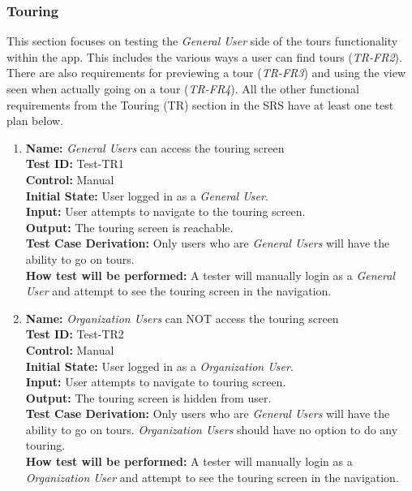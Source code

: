 \documentclass[12pt, titlepage]{article}
\begin{document}
\subsubsection{Touring}

This section focuses on testing the \textit{General User} side of the tours functionality within the app. This includes the various ways a user can find tours (\textit{TR-FR2}). There are also requirements for previewing a tour (\textit{TR-FR3}) and using the view seen when actually going on a tour (\textit{TR-FR4}). All the other functional requirements from the Touring (TR) section in the SRS \cite{SRS} have at least one test plan below.

\begin{enumerate}

  \item
        \textbf{Name:} \textit{General Users} can access the touring screen \label{itm:Test-TR1} \\
        \textbf{Test ID:} Test-TR1 \\
        \textbf{Control:} Manual \\
        \textbf{Initial State:} User logged in as a \textit{General User}. \\
        \textbf{Input:} User attempts to navigate to the touring screen. \\
        \textbf{Output:} The touring screen is reachable. \\
        \textbf{Test Case Derivation:} Only users who are \textit{General Users} will have the ability to go on tours. \\
        \textbf{How test will be performed:} A tester will manually login as a \textit{General User} and attempt to see the touring screen in the navigation.

  \item
        \textbf{Name:} \textit{Organization Users} can NOT access the touring screen \label{itm:Test-TR2} \\
        \textbf{Test ID:} Test-TR2 \\
        \textbf{Control:} Manual \\
        \textbf{Initial State:} User logged in as a \textit{Organization User}. \\
        \textbf{Input:} User attempts to navigate to touring screen. \\
        \textbf{Output:} The touring screen is hidden from user. \\
        \textbf{Test Case Derivation:} Only users who are \textit{General Users} will have the ability to go on tours. \textit{Organization Users} should have no option to do any touring. \\
        \textbf{How test will be performed:} A tester will manually login as a \textit{Organization User} and attempt to see the touring screen in the navigation.


\end{enumerate}
\end{document}
